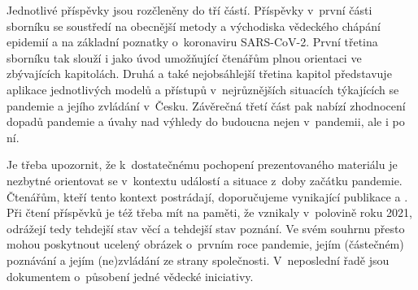  Jednotlivé příspěvky jsou rozčleněny do tří částí. Příspěvky v~první části sborníku se soustředí na obecnější metody a východiska vědeckého chápání epidemií a na základní poznatky o~koronaviru SARS-CoV-2. První třetina sborníku tak slouží i jako úvod umožňující čtenářům plnou orientaci ve zbývajících kapitolách. Druhá a také nejobsáhlejší třetina kapitol představuje aplikace jednotlivých modelů a přístupů v~nejrůznějších situacích týkajících se pandemie a jejího zvládání v~Česku. Závěrečná třetí část pak nabízí zhodnocení dopadů pandemie a úvahy nad výhledy do budoucna nejen v~pandemii, ale i po ní.

 Je třeba upozornit, že k~dostatečnému pochopení prezentovaného materiálu je nezbytné orientovat se v~kontextu událostí a situace z~doby začátku pandemie. Čtenářům, kteří tento kontext postrádají, doporučujeme vynikající publikace \cite{kubal1} a \cite{kubal2}.
 Při čtení příspěvků je též třeba mít na paměti, že vznikaly v~polovině roku 2021, odrážejí tedy tehdejší stav věcí a tehdejší stav poznání. Ve svém souhrnu přesto mohou poskytnout ucelený obrázek o~prvním roce pandemie, jejím (částečném) poznávání a jejím (ne)zvládání ze strany společnosti. V~neposlední řadě jsou dokumentem o~působení jedné vědecké iniciativy.

